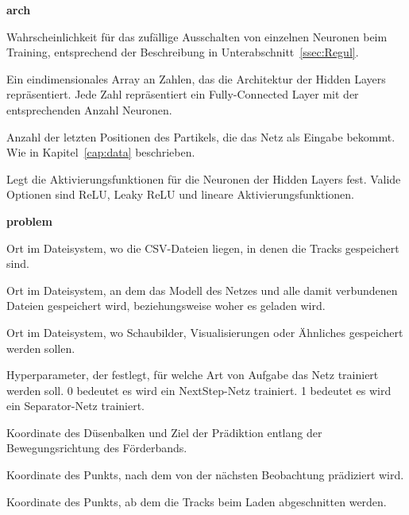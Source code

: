 
\newpage
{\Large \sffamily \textbf{arch}}
\begin{description}[leftmargin=!,labelwidth=\widthof{\bfseries separatorPosition}, labelindent=0.5cm]
    \item [dropoutRate] Wahrscheinlichkeit für das zufällige Ausschalten von einzelnen Neuronen beim Training, entsprechend der Beschreibung in Unterabschnitt~\ref{ssec:Regul}.
    \item [hiddenLayers] Ein ein­di­men­si­o­nales Array an Zahlen, das die Architektur der Hidden Layers repräsentiert. Jede Zahl repräsentiert ein Fully-Connected Layer mit der entsprechenden Anzahl Neuronen.
    \item [featureSize] Anzahl der letzten Positionen des Partikels, die das Netz als Eingabe bekommt. Wie in Kapitel~\ref{cap:data} beschrieben.
    \item [activation] Legt die Aktivierungsfunktionen für die Neuronen der Hidden Layers fest. Valide Optionen sind ReLU, Leaky ReLU und lineare Aktivierungsfunktionen.
\end{description}

\bigskip
{\Large \sffamily \textbf{problem}}

\begin{description}[leftmargin=!,labelwidth=\widthof{\bfseries separatorPosition}, labelindent=0.5cm]
    \item[dataPath] Ort im Dateisystem, wo die CSV-Dateien liegen, in denen die Tracks gespeichert sind.
    \item[modelBasePath] Ort im Dateisystem, an dem das Modell des Netzes und alle damit verbundenen Dateien gespeichert wird, beziehungsweise woher es geladen wird. 
    \item [imagePath] Ort im Dateisystem, wo Schaubilder, Visualisierungen oder Ähnliches gespeichert werden sollen.
    \item [separator] Hyperparameter, der festlegt, für welche Art von Aufgabe das Netz trainiert werden soll. 0 bedeutet es wird ein NextStep-Netz trainiert. 1 bedeutet es wird ein Separator-Netz trainiert.
\end{description}

\begin{description}[leftmargin=!,labelwidth=\widthof{\bfseries separatorPosition}, labelindent=0.5cm]
    \item[separatorPosition] Koordinate des Düsenbalken und Ziel der Prädiktion entlang der Bewegungsrichtung des Förderbands.
    \item[thresholdPoint] Koordinate des Punkts, nach dem von der nächsten Beobachtung prädiziert wird.
    \item[predictionCutOff] Koordinate des Punkts, ab dem die Tracks beim Laden abgeschnitten werden.
\end{description}


